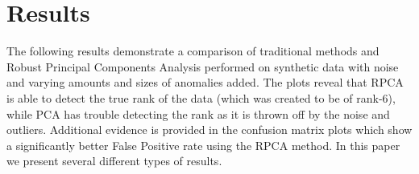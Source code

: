 \documentclass[conference]{IEEEtran}
\begin{document}

\section{Results}
The following results demonstrate a comparison of traditional methods and Robust Principal Components Analysis performed on synthetic data with noise and varying amounts and sizes of anomalies added.  The plots reveal that RPCA is able to detect the true rank of the data (which was created to be of rank-6), while PCA has trouble detecting the rank as it is thrown off by the noise and outliers.  Additional evidence is provided in the confusion matrix plots which show a significantly better False Positive rate using the RPCA method.
In this paper we present several different types of results. 
\end{document}
